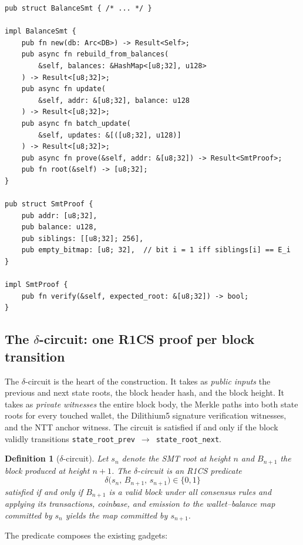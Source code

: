 \documentclass[11pt,a4paper]{article}
\newtheorem{definition}{Definition}
\begin{document}
\begin{lstlisting}[caption={Public API of the shipped sparse Merkle tree, \texttt{crates/q-storage/src/balance\_smt.rs}.},label={lst:smtapi}]
pub struct BalanceSmt { /* ... */ }

impl BalanceSmt {
    pub fn new(db: Arc<DB>) -> Result<Self>;
    pub async fn rebuild_from_balances(
        &self, balances: &HashMap<[u8;32], u128>
    ) -> Result<[u8;32]>;
    pub async fn update(
        &self, addr: &[u8;32], balance: u128
    ) -> Result<[u8;32]>;
    pub async fn batch_update(
        &self, updates: &[([u8;32], u128)]
    ) -> Result<[u8;32]>;
    pub async fn prove(&self, addr: &[u8;32]) -> Result<SmtProof>;
    pub fn root(&self) -> [u8;32];
}

pub struct SmtProof {
    pub addr: [u8;32],
    pub balance: u128,
    pub siblings: [[u8;32]; 256],
    pub empty_bitmap: [u8; 32],  // bit i = 1 iff siblings[i] == E_i
}

impl SmtProof {
    pub fn verify(&self, expected_root: &[u8;32]) -> bool;
}
\end{lstlisting}

\subsection{The $\delta$-circuit: one R1CS proof per block transition}

The $\delta$-circuit is the heart of the construction. It takes as
\emph{public inputs} the previous and next state roots, the block header
hash, and the block height. It takes as \emph{private witnesses} the
entire block body, the Merkle paths into both state roots for every
touched wallet, the Dilithium5 signature verification witnesses, and
the NTT anchor witness. The circuit is satisfied if and only if the
block validly transitions \texttt{state\_root\_prev}~$\to$~\texttt{state\_root\_next}.

\begin{definition}[$\delta$-circuit]
\label{def:deltacircuit}
Let $s_{n}$ denote the SMT root at height $n$ and $B_{n+1}$ the block
produced at height $n+1$. The $\delta$-circuit is an R1CS predicate
\[
  \delta\big(s_n,\, B_{n+1},\, s_{n+1}\big) \in \{0,1\}
\]
satisfied if and only if $B_{n+1}$ is a valid block under all
consensus rules and applying its transactions, coinbase, and emission
to the wallet--balance map committed by $s_n$ yields the map committed
by $s_{n+1}$.
\end{definition}

The predicate composes the existing gadgets:
\end{document}
